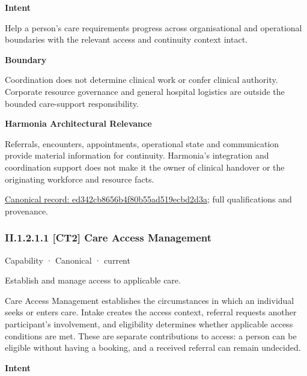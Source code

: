 \textbf{Intent}



Help a person's care requirements progress across organisational and operational boundaries with the relevant access and continuity context intact.



\textbf{Boundary}



Coordination does not determine clinical work or confer clinical authority. Corporate resource governance and general hospital logistics are outside the bounded care-support responsibility.



\textbf{Harmonia Architectural Relevance}



Referrals, encounters, appointments, operational state and communication provide material information for continuity. Harmonia's integration and coordination support does not make it the owner of clinical handover or the originating workforce and resource facts.


{\footnotesize \href{../../../../../../../continuum/strategy/capability/ed342cb8656b4f80b55ad519ecbd2d3a.md}{Canonical record: ed342cb8656b4f80b55ad519ecbd2d3a}; full qualifications and provenance.}\par
\subsubsection*{II.1.2.1.1 [CT2] Care Access Management}
\label{navigation:II.1.2.1.1}

\label{element:acbcad8330e64b59be5e3ec4a100a544}
{\small Capability · Canonical · current}\par

Establish and manage access to applicable care.



Care Access Management establishes the circumstances in which an individual seeks or enters care. Intake creates the access context, referral requests another participant's involvement, and eligibility determines whether applicable access conditions are met. These are separate contributions to access: a person can be eligible without having a booking, and a received referral can remain undecided.



\textbf{Intent}



